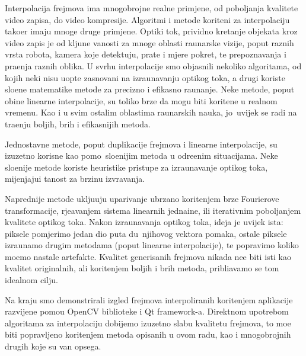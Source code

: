 Interpolacija frejmova ima mnogobrojne realne primjene, od pobolj\sh anja kvalitete video zapisa, do video kompresije. Algoritmi i metode kori\sh teni za interpolaciju
tako\dj er imaju mnoge druge primjene. Opti\ch ki tok, prividno kretanje objekata kroz video zapis je od klju\ch ne va\zh nosti za mnoge oblasti ra\ch unarske vizije, poput
raznih vrsta robota, kamera koje detektuju, prate i mjere pokret, te prepoznavanja i pra\cj enja raznih oblika. U svrhu interpolacije smo objasnili nekoliko algoritama, od kojih
neki nisu uop\sh te zasnovani na izra\ch unavanju opti\ch kog toka, a drugi koriste slo\zh ene matemati\ch ke metode za precizno i efikasno ra\ch unanje. Neke metode,
poput obi\ch ne linearne interpolacije, su toliko brze da mogu biti kori\sh tene u realnom vremenu. Kao i u svim ostalim oblastima ra\ch unarskih nauka, jo\sh\ uvijek se radi
na tra\zh enju boljih, br\zh ih i efikasnijih metoda.

Jednostavne metode, poput duplikacije frejmova i linearne interpolacije, su izuzetno korisne kao pomo\cj\ slo\zh enijim metoda u odre\dj enim situacijama. Neke slo\zh enije
metode koriste heuristi\ch ke pristupe za izra\ch unavanje opti\ch kog toka, mijenjaju\cj i ta\ch nost za brzinu izvr\sh avanja.

Naprednije metode uklju\ch uju uparivanje ubrzano kori\sh tenjem brze Fourierove transformacije, rje\sh avanjem sistema linearnih jedna\ch ine, ili iterativnim pobolj\sh anjem
kvalitete opti\ch kog toka. Nakon izra\ch unavanja opti\ch kog toka, ideja je uvijek ista: piksele pomjerimo jedan dio puta du\zh\ njihovog vektora pomaka, ostale piksele izra\ch unamo
drugim metodama (poput linearne interpolacije), te popravimo koliko mo\zh emo nastale artefakte. Kvalitet generisanih frejmova nikada ne\cj e biti isti kao kvalitet originalnih,
ali kori\sh tenjem boljih i br\zh ih metoda, pribli\zh avamo se tom idealnom cilju.

Na kraju smo demonstrirali izgled frejmova interpoliranih kori\sh tenjem aplikacije razvijene pomo\cj u OpenCV biblioteke i Qt framework-a. Direktnom upotrebom algoritama
za interpolaciju dobijemo izuzetno slabu kvalitetu frejmova, \sh to mo\zh e biti popravljeno kori\sh tenjem metoda opisanih u ovom radu, kao i mnogobrojnih drugih
koje su van opsega.